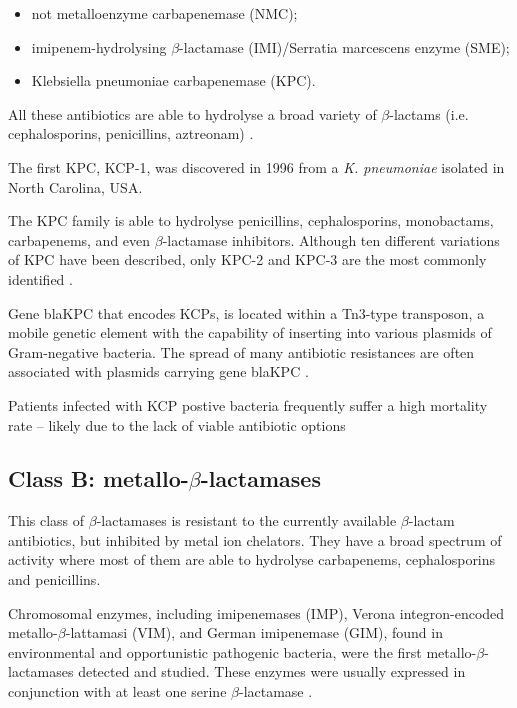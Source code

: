 \documentclass[11pt]{report}
\begin{document}
\begin{itemize}
\item not metalloenzyme carbapenemase (NMC);
\item imipenem-hydrolysing $\beta$-lactamase (IMI)/Serratia marcescens enzyme (SME); 
\item Klebsiella pneumoniae carbapenemase (KPC).
\end{itemize}

All these antibiotics are able to hydrolyse a broad variety of $\beta$-lactams (i.e. cephalosporins, penicillins, aztreonam) \cite{kong2010beta} \cite{Queenan2007}.

The first KPC, KCP-1, was discovered in 1996 from a \emph{K. pneumoniae} isolated in North Carolina, USA.

The KPC family is able to hydrolyse penicillins, cephalosporins, monobactams, carbapenems, and even $\beta$-lactamase inhibitors. Although ten different variations of KPC have been described, only KPC-2 and KPC-3 are the most commonly identified \cite{WaltherRasmussen2007} \cite{MunozPrice2013}.

Gene blaKPC that encodes KCPs, is located within a Tn3-type transposon, a mobile genetic element with the capability of inserting into various plasmids of Gram-negative bacteria. The spread of many antibiotic resistances are often associated with plasmids carrying gene blaKPC \cite{Queenan2007}.

Patients infected with KCP postive bacteria frequently suffer a high mortality rate – likely due to the lack of viable antibiotic options \cite{MunozPrice2013}

\subsection {Class B: metallo-$\beta$-lactamases}
This class of $\beta$-lactamases is resistant to the currently available $\beta$-lactam antibiotics, but inhibited by metal ion chelators.
They have a broad spectrum of activity where most of them are able to hydrolyse carbapenems, cephalosporins and penicillins.

Chromosomal enzymes, including imipenemases (IMP), Verona integron-encoded metallo-$\beta$-lattamasi (VIM), and German imipenemase (GIM), found in environmental and opportunistic pathogenic bacteria, were the first metallo-$\beta$-lactamases detected and studied.
These enzymes were usually expressed in conjunction with at least one serine $\beta$-lactamase \cite{Queenan2007}.
\end{document}
